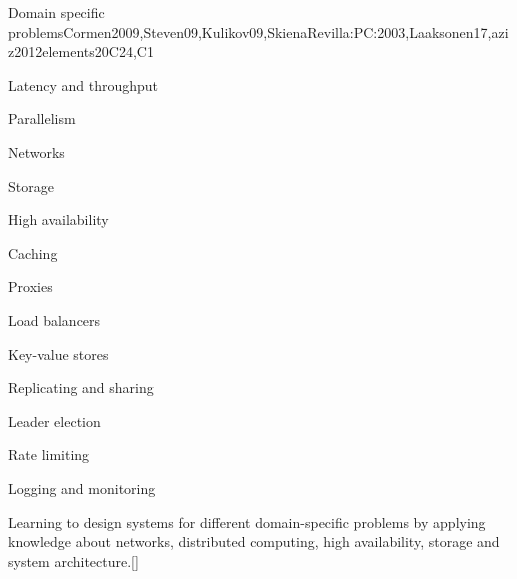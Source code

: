 \begin{syllabus}
  \begin{unit}{Domain specific problems}{}{Cormen2009,Steven09,Kulikov09,SkienaRevilla:PC:2003,Laaksonen17,aziz2012elements}{20}{C24,C1}
    \begin{topics}
      \item Latency and throughput
      \item Parallelism
      \item Networks
      \item Storage
      \item High availability
      \item Caching
      \item Proxies
      \item Load balancers
      \item Key-value stores
      \item Replicating and sharing
      \item Leader election
      \item Rate limiting
      \item Logging and monitoring
    \end{topics}
    \begin{learningoutcomes}
        \item Learning to design systems for different domain-specific problems by applying knowledge about networks, distributed computing, high availability, storage and system architecture.[\Usage]
    \end{learningoutcomes}
  \end{unit}
  
  \begin{coursebibliography}
  \end{coursebibliography}
  
  \end{syllabus}
  